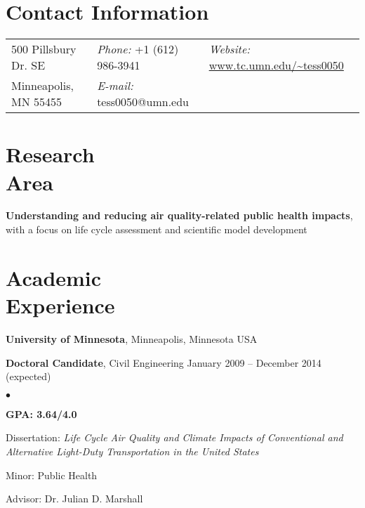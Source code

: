 \documentclass[margin,line,10pt]{res}
\newenvironment{list1}{
  \begin{list}{\ding{113}}{%
      \setlength{\itemsep}{0in}
      \setlength{\parsep}{0in} \setlength{\parskip}{0in}
      \setlength{\topsep}{0in} \setlength{\partopsep}{0in} 
      \setlength{\leftmargin}{0.17in}}}{\end{list}}
\newenvironment{list2}{
  \begin{list}{$\bullet$}{%
      \setlength{\itemsep}{0in}
      \setlength{\parsep}{0in} \setlength{\parskip}{0in}
      \setlength{\topsep}{0in} \setlength{\partopsep}{0in} 
      \setlength{\leftmargin}{0.2in}}}{\end{list}}
\begin{document}
\thispagestyle{empty}

\begin{resume}
\section{\sc Contact Information}
\vspace{.05in}
\begin{tabular}{@{}p{1.6in}p{1.7in}p{2.5in}}
500 Pillsbury Dr. SE	& 
{\it Phone:} +1 (612) 986-3941 & 
{\it Website:} \url{www.tc.umn.edu/~tess0050} \\            
Minneapolis, MN 55455		& 
{\it E-mail:}  tess0050@umn.edu & \\     		    
\end{tabular}

\section{\sc Research\\Area}

\textbf{Understanding and reducing air quality-related public health impacts}, with a focus on life cycle assessment and scientific model development


\section{\sc Academic\\Experience}
\textbf{University of Minnesota}, Minneapolis, Minnesota USA\\

\vspace*{-.13in}

\begin{list1}
\item[] \textbf{Doctoral Candidate}, Civil Engineering \hfill January 2009 -- December 2014 (expected)\\
\begin{list2}
\vspace*{-.12in}
\item \textbf{GPA: 3.64/4.0}
\item Dissertation: \textit{Life Cycle Air Quality and Climate Impacts of Conventional and Alternative Light-Duty Transportation in the United States}
\item Minor: Public Health
\item Advisor:  Dr. Julian D. Marshall
\end{list2}


\end{list1}
\end{resume}
\end{document}
